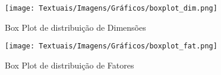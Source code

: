 

\begin{figure}[ht!]
    \centering
    \caption{Box Plot de distribuição de Dimensões}
    \texttt{[image: Textuais/Imagens/Gráficos/boxplot\_dim.png]}
    \label{fig:box_plot_dimensoes}
\end{figure}



\begin{figure}[ht!]
    \centering
    \caption{Box Plot de distribuição de Fatores}
    \texttt{[image: Textuais/Imagens/Gráficos/boxplot\_fat.png]}
    \label{fig:box_plot_fatores}
\end{figure}






